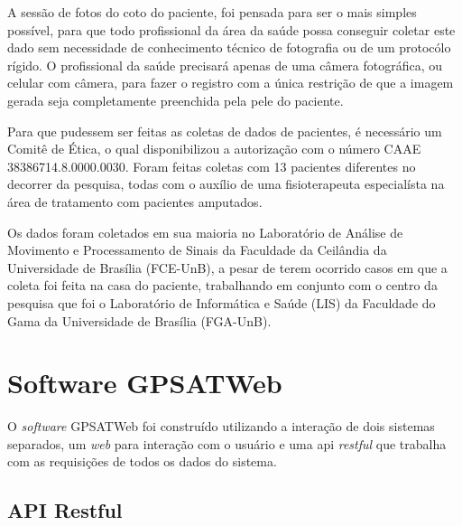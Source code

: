     A sessão de fotos do coto do paciente, foi pensada para ser o mais simples possível, para que todo profissional da área da saúde possa conseguir coletar este dado sem necessidade de conhecimento técnico de fotografia ou de um protocólo rígido. O profissional da saúde precisará apenas de uma câmera fotográfica, ou celular com câmera, para fazer o registro com a única restrição de que a imagem gerada seja completamente preenchida pela pele do paciente.

    Para que pudessem ser feitas as coletas de dados de pacientes, é necessário um Comitê de Ética, o qual disponibilizou a autorização com o número CAAE 38386714.8.0000.0030. Foram feitas coletas com 13 pacientes diferentes no decorrer da pesquisa, todas com o auxílio de uma fisioterapeuta especialísta na área de tratamento com pacientes amputados.

    Os dados foram coletados em sua maioria no Laboratório de Análise de Movimento e Processamento de Sinais da Faculdade da Ceilândia da Universidade de Brasília (FCE-UnB), a pesar de terem ocorrido casos em que a coleta foi feita na casa do paciente, trabalhando em conjunto com o centro da pesquisa que foi o Laboratório de Informática e Saúde (LIS) da Faculdade do Gama da Universidade de Brasília (FGA-UnB). 



\section{Software GPSATWeb}
    O \textit{software} GPSATWeb foi construído utilizando a interação de dois sistemas separados, um \textit{web} para interação com o usuário e uma api \textit{restful} que trabalha com as requisições de todos os dados do sistema. 

    \subsection{API Restful}

